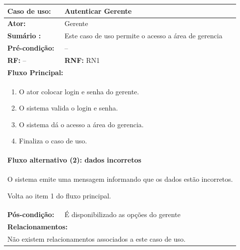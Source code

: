 \documentclass[
	12pt,				%
	openright,
	oneside,			%
	a4paper,			%
	chapter=TITLE,		%
	brazil				%
	]{abntex2}
\begin{document}
\begin{table}[h]
\centering
\begin{tabular}{|p{3cm}|p{3cm}|p{3cm}|p{3cm}|}
\hline
\textbf{Caso de uso:}             & \multicolumn{3}{p{9cm}|}{Autenticar Gerente}				 \\ \hline
\textbf{Ator:}                 & \multicolumn{3}{p{9cm}|}{Gerente}         			          						 	\\ \hline
\textbf{Sumário :}                & \multicolumn{3}{p{9cm}|}{Este caso de uso permite o acesso a área de gerencia%
																												}         	\\ \hline
\textbf{Pré-condição:}            & \multicolumn{3}{p{9cm}|}{ -- }                				    \\ \hline
\multicolumn{2}{|p{6cm}|}{\textbf{RF:} -- }                  & \multicolumn{2}{p{6cm}|}{\textbf{RNF:} RN1}     	    \\ \hline
\multicolumn{4}{|p{12cm}|}{\textbf{Fluxo Principal:}}                                                					\\ \hline
\multicolumn{4}{|p{12cm}|}{%
\begin{enumerate}
  \item O ator colocar login e senha do gerente.
  \item O sistema valida o login e senha.
  \item O sistema dá o acesso a área do gerencia.
  \item Finaliza o caso de uso.
\end{enumerate}}                                                               				 							\\ \hline
\multicolumn{4}{|p{12cm}|}{\textbf{Fluxo alternativo (2): dados incorretos }}            									\\ \hline
\multicolumn{4}{|p{12cm}|}{%
\begin{alineas}
  \item O sistema emite uma mensagem informando que os dados estão incorretos.
  \item Volta ao item 1 do fluxo principal.
\end{alineas}}                                                               				 							\\ \hline
\textbf{Pós-condição: }  & \multicolumn{3}{p{9cm}|}{ É disponibilizado as opções do gerente }		\\ \hline
\multicolumn{4}{|p{12cm}|}{\textbf{Relacionamentos:}}                                        								\\ \hline
\multicolumn{4}{|p{12cm}|}{Não existem relacionamentos associados a este caso de uso.}                                  \\ \hline
\end{tabular}
\end{table}
\end{document}
